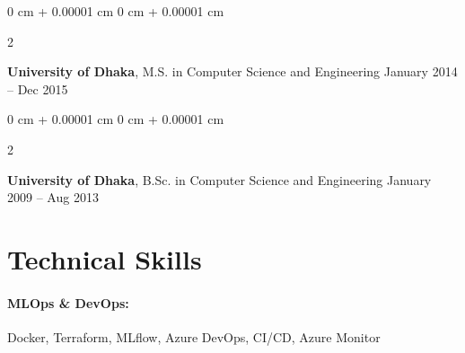 \documentclass[10pt, letterpaper]{article}
\newenvironment{highlights}{
    \begin{itemize}[
        topsep=0.10 cm,
        parsep=0.10 cm,
        partopsep=0pt,
        itemsep=0pt,
        leftmargin=0 cm + 10pt
    ]
}{
    \end{itemize}
} %
\newenvironment{onecolentry}{
    \begin{adjustwidth}{
        0 cm + 0.00001 cm
    }{
        0 cm + 0.00001 cm
    }
}{
    \end{adjustwidth}
} %
\newenvironment{twocolentry}[2][]{
    \onecolentry
    \def\secondColumn{#2}
    \setcolumnwidth{\fill, 4.5 cm}
    \begin{paracol}{2}
}{
    \switchcolumn \raggedleft \secondColumn
    \end{paracol}
    \endonecolentry
} %
\begin{document}
        \begin{twocolentry}{
            January 2014 – Dec 2015
        }
            \textbf{University of Dhaka}, M.S. in Computer Science and Engineering\end{twocolentry}


        \begin{twocolentry}{
            January 2009 – Aug 2013
        }
            \textbf{University of Dhaka}, B.Sc. in Computer Science and Engineering\end{twocolentry}
    
        




\vspace{-1mm}
\section{Technical Skills}

        \paragraph{MLOps \& DevOps:} Docker, Terraform, MLflow, Azure DevOps, CI/CD, Azure Monitor
        \vspace{-4mm}
\end{document}

